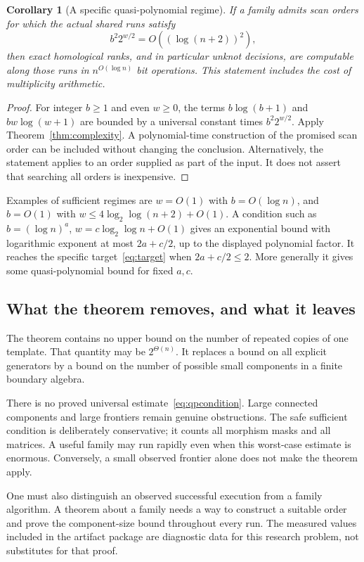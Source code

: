 \documentclass[11pt,letterpaper]{article}
\newtheorem{corollary}[theorem]{Corollary}
\begin{document}
\begin{corollary}[A specific quasi-polynomial regime]\label{cor:qp}
If a family admits scan orders for which the actual shared runs satisfy
\begin{equation}\label{eq:qpcondition}
 b^2 2^{w/2}=O\!\left((\log(n+2))^2\right),
\end{equation}
then exact homological ranks, and in particular unknot decisions, are
computable along those runs in $n^{O(\log n)}$ bit operations. This statement
includes the cost of multiplicity arithmetic.
\end{corollary}
\begin{proof}
For integer $b\ge1$ and even $w\ge0$, the terms $b\log(b+1)$ and
$bw\log(w+1)$ are bounded by a universal constant times $b^2 2^{w/2}$.
Apply Theorem~\ref{thm:complexity}. A polynomial-time construction of the
promised scan order can be included without changing the conclusion.
Alternatively, the statement applies to an order supplied as part of the
input. It does not assert that searching all orders is inexpensive.
\end{proof}

Examples of sufficient regimes are $w=O(1)$ with $b=O(\log n)$, and
$b=O(1)$ with $w\le4\log_2\log(n+2)+O(1)$. A condition such as
$b=(\log n)^a$, $w=c\log_2\log n+O(1)$ gives an exponential bound with
logarithmic exponent at most $2a+c/2$, up to the displayed polynomial factor.
It reaches the specific target~\eqref{eq:target} when $2a+c/2\le2$.
More generally it gives some quasi-polynomial bound for fixed $a,c$.

\subsection{What the theorem removes, and what it leaves}
The theorem contains no upper bound on the number of repeated copies of
one template. That quantity may be $2^{\Theta(n)}$. It replaces a bound on
all explicit generators by a bound on the number of possible small
components in a finite boundary algebra.

There is no proved universal estimate~\eqref{eq:qpcondition}. Large
connected components and large frontiers remain genuine obstructions.
The safe sufficient condition is deliberately conservative; it counts
all morphism masks and all matrices. A useful family may run rapidly even
when this worst-case estimate is enormous. Conversely, a small observed
frontier alone does not make the theorem apply.

One must also distinguish an observed successful execution from a family
algorithm. A theorem about a family needs a way to construct a suitable
order and prove the component-size bound throughout every run. The measured
values included in the artifact package are diagnostic data for this
research problem, not substitutes for that proof.





\end{document}
